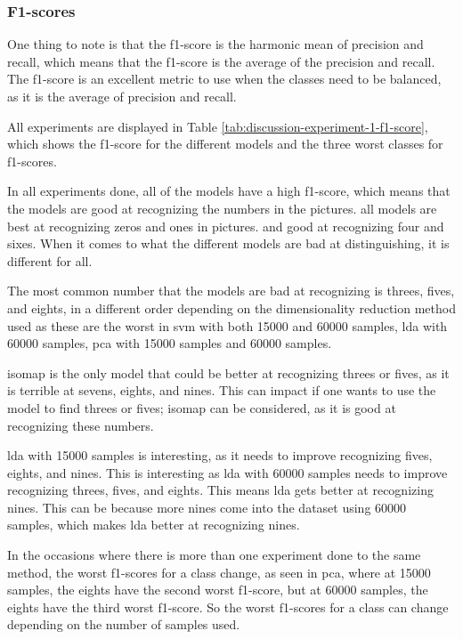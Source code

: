 \subsubsection{F1-scores}\label{subsec:discussion-experiment-1-f1-score}
One thing to note is that the f1-score is the harmonic mean of precision and recall, which means that the f1-score is the average of the precision and recall. The f1-score is an excellent metric to use when the classes need to be balanced, as it is the average of precision and recall.



All experiments are displayed in Table \ref{tab:discussion-experiment-1-f1-score}, which shows the f1-score for the different models and the three worst classes for f1-scores.

In all experiments done, all of the models have a high f1-score, which means that the models are good at recognizing the numbers in the pictures. all models are best at recognizing zeros and ones in pictures. and good at recognizing four and sixes. When it comes to what the different models are bad at distinguishing, it is different for all.

The most common number that the models are bad at recognizing is threes, fives, and eights, in a different order depending on the dimensionality reduction method used as these are the worst in \gls{svm} with both 15000 and 60000 samples, \gls{lda} with 60000 samples, \gls{pca} with 15000 samples and 60000 samples.

\gls{isomap} is the only model that could be better at recognizing threes or fives, as it is terrible at sevens, eights, and nines. This can impact if one wants to use the model to find threes or fives; \gls{isomap} can be considered, as it is good at recognizing these numbers.

\gls{lda} with 15000 samples is interesting, as it needs to improve recognizing fives, eights, and nines. This is interesting as \gls{lda} with 60000 samples needs to improve recognizing threes, fives, and eights. This means \gls{lda} gets better at recognizing nines. This can be because more nines come into the dataset using 60000 samples, which makes \gls{lda} better at recognizing nines.

In the occasions where there is more than one experiment done to the same method, the worst f1-scores for a class change, as seen in \gls{pca}, where at 15000 samples, the eights have the second worst f1-score, but at 60000 samples, the eights have the third worst f1-score. So the worst f1-scores for a class can change depending on the number of samples used.


